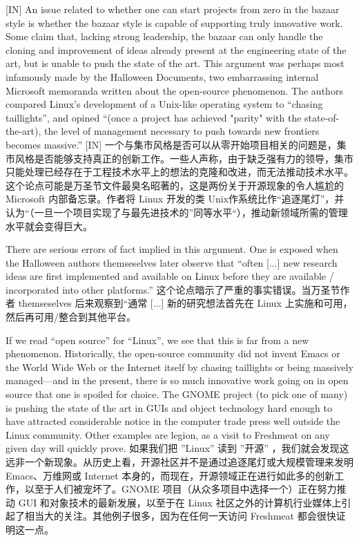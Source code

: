 \documentclass[a4paper,12pt,UTF8,twoside]{ctexbook}
\begin{document}
[IN] An issue related to whether one can start projects from zero in the bazaar style is whether the bazaar style is capable of supporting truly innovative work. Some claim that, lacking strong leadership, the bazaar can only handle the cloning and improvement of ideas already present at the engineering state of the art, but is unable to push the state of the art. This argument was perhaps most infamously made by the Halloween Documents, two embarrassing internal Microsoft memoranda written about the open-source phenomenon. The authors compared Linux's development of a Unix-like operating system to ``chasing taillights'', and opined ``(once a project has achieved "parity" with the state-of-the-art), the level of management necessary to push towards new frontiers becomes massive.''
[IN] 一个与集市风格是否可以从零开始项目相关的问题是，集市风格是否能够支持真正的创新工作。一些人声称，由于缺乏强有力的领导，集市只能处理已经存在于工程技术水平上的想法的克隆和改进，而无法推动技术水平。这个论点可能是万圣节文件最臭名昭著的，这是两份关于开源现象的令人尴尬的 Microsoft 内部备忘录。作者将 Linux 开发的类 Unix作系统比作“追逐尾灯”，并认为“（一旦一个项目实现了与最先进技术的”同等水平“），推动新领域所需的管理水平就会变得巨大。

There are serious errors of fact implied in this argument. One is exposed when the Halloween authors themseselves later observe that ``often [...] new research ideas are first implemented and available on Linux before they are available / incorporated into other platforms.''
这个论点暗示了严重的事实错误。当万圣节作者 themseselves 后来观察到“通常 [...] 新的研究想法首先在 Linux 上实施和可用，然后再可用/整合到其他平台。

If we read ``open source'' for ``Linux'', we see that this is far from a new phenomenon. Historically, the open-source community did not invent Emacs or the World Wide Web or the Internet itself by chasing taillights or being massively managed—and in the present, there is so much innovative work going on in open source that one is spoiled for choice. The GNOME project (to pick one of many) is pushing the state of the art in GUIs and object technology hard enough to have attracted considerable notice in the computer trade press well outside the Linux community. Other examples are legion, as a visit to Freshmeat on any given day will quickly prove.
如果我们把 ''Linux'' 读到 ''开源'' ，我们就会发现这远非一个新现象。从历史上看，开源社区并不是通过追逐尾灯或大规模管理来发明 Emacs、万维网或 Internet 本身的，而现在，开源领域正在进行如此多的创新工作，以至于人们被宠坏了。GNOME 项目（从众多项目中选择一个）正在努力推动 GUI 和对象技术的最新发展，以至于在 Linux 社区之外的计算机行业媒体上引起了相当大的关注。其他例子很多，因为在任何一天访问 Freshmeat 都会很快证明这一点。
\end{document}
